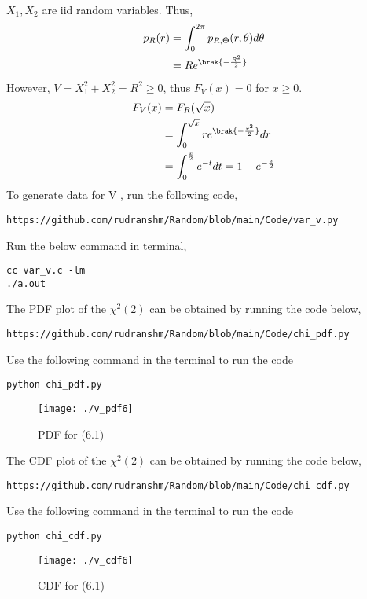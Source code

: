 \documentclass[journal,12pt,twocolumn]{IEEEtran}
\begin{document}
\begin{enumerate}[label=\thesection.\arabic*
,ref=\thesection.\theenumi]
\begin{align}
		\end{align}
   $X_1, X_2$ are iid random variables. Thus,
		\begin{align}
			p_R(r) &= \int_{0}^{2\pi}p_{R, \Theta}(r, \theta)d\theta \\
			&= R e^{\brak{-\frac{R^2}{2}}}
		\end{align}
However, $V = X_1^2 + X_2^2 = R^2 \geq 0$, thus $F_V(x) = 0$ for $x \geq 0$.
		\begin{align}
			F_V(x) &= F_R(\sqrt{x}) \\ 
			&= \int_{0}^{\sqrt{x}}r e^{\brak{-\frac{r^2}{2}}}dr \\
			&= \int_{0}^{\frac{x}{2}}e^{-t}dt = 1 - e^{-\frac{x}{2}}
		\end{align}
To generate data for V , run the following code,
\begin{lstlisting}
https://github.com/rudranshm/Random/blob/main/Code/var_v.py
\end{lstlisting}
Run the below command in terminal,
\begin{lstlisting}
cc var_v.c -lm
./a.out
\end{lstlisting}
The PDF plot of the $\chi^{2} (2)$ can be obtained by running the code below,
\begin{lstlisting}
https://github.com/rudranshm/Random/blob/main/Code/chi_pdf.py
\end{lstlisting}
Use the following command in the terminal to run the code
\begin{lstlisting}
python chi_pdf.py
\end{lstlisting}
\begin{figure}
\texttt{[image: ./v\_pdf6]}
\caption{PDF for (6.1)}
\label{fig:chi_PDF}
\end{figure}
The CDF plot of the $\chi^{2} (2)$ can be obtained by running the code below,
\begin{lstlisting}
https://github.com/rudranshm/Random/blob/main/Code/chi_cdf.py
\end{lstlisting}
Use the following command in the terminal to run the code
\begin{lstlisting}
python chi_cdf.py
\end{lstlisting}
\begin{figure}
\texttt{[image: ./v\_cdf6]}
\caption{CDF for (6.1)}
\label{fig:chi_PDF}
\end{figure}


\end{enumerate}
\end{document}
